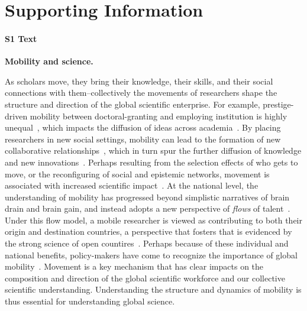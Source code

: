 \documentclass[12pt]{article} %
\newcommand{\beginsupplement}{%
        \setcounter{table}{0}
        \renewcommand{\thetable}{S\arabic{table}}%
        \setcounter{figure}{0}
        \renewcommand{\thefigure}{S\arabic{figure}}%
     }
\begin{document}
\clearpage
\beginsupplement
\section{Supporting Information}



%
%
\paragraph*{S1 Text}
\label{si:text:mobility_science}
{\bf Mobility and science.}

As scholars move, they bring their knowledge, their skills, and their social connections with them--collectively the movements of researchers shape the structure and direction of the global scientific enterprise.
For example, prestige-driven mobility between doctoral-granting and employing institution is highly unequal~\autocite{clauset2015hierarchy, deville2014career}, which impacts the diffusion of ideas across academia~\autocite{morgan2018prestige}.
By placing researchers in new social settings, mobility can lead to the formation of new collaborative relationships~\autocite{rodrigues2016mobility}, which in turn spur the further diffusion of knowledge and new innovations~\autocite{braunerhjelm2020labor, azoulay2011diffusion, kaiser2018innovation, armano2017innovation}.
Perhaps resulting from the selection effects of who gets to move, or the reconfiguring of social and epistemic networks, movement is associated with increased scientific impact~\autocite{sugimoto2017mostimpact, petersen2018multiscale, jonkers2013return, franzoni2014advantage}.
At the national level, the understanding of mobility has progressed beyond simplistic narratives of brain drain and brain gain, and instead adopts a new perspective of \textit{flows} of talent~\autocite{meyer2001network, ioannidis2014braindrain, gaillard1998circulation}.
Under this flow model, a mobile researcher is viewed as contributing to both their origin and destination countries, a perspective that fosters that is evidenced by the strong science of open countires~\autocite{wagner2017open}.
Perhaps because of these individual and national benefits, policy-makers have come to recognize the importance of global mobility~\autocite{box2008competition, oecd2010innovation}.
Movement is a key mechanism that has clear impacts on the composition and direction of the global scientific workforce and our collective scientific understanding.
Understanding the structure and dynamics of mobility is thus essential for understanding global science.
\end{document}

